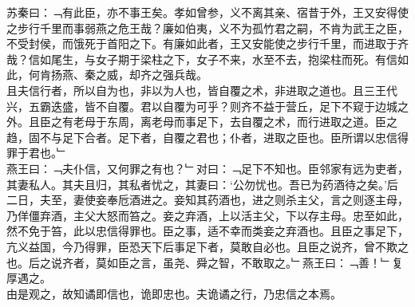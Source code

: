 苏秦曰：﹁有此臣，亦不事王矣。孝如曾参，义不离其亲、宿昔于外，王又安得使之步行千里而事弱燕之危王哉？廉如伯夷，义不为孤竹君之嗣，不肯为武王之臣，不受封侯，而饿死于首阳之下。有廉如此者，王又安能使之步行千里，而进取于齐哉？信如尾生，与女子期于梁柱之下，女子不来，水至不去，抱梁柱而死。有信如此，何肯扬燕、秦之威，却齐之强兵哉。\\
且夫信行者，所以自为也，非以为人也，皆自覆之术，非进取之道也。且三王代兴，五霸迭盛，皆不自覆。君以自覆为可乎？则齐不益于营丘，足下不窥于边城之外。且臣之有老母于东周，离老母而事足下，去自覆之术，而行进取之道。臣之趋，固不与足下合者。足下者，自覆之君也；仆者，进取之臣也。臣所谓以忠信得罪于君也。﹂\\
燕王曰：﹁夫仆信，又何罪之有也？﹂对曰：﹁足下不知也。臣邻家有远为吏者，其妻私人。其夫且归，其私者忧之，其妻曰：‘公勿忧也。吾已为药酒待之矣。’后二日，夫至，妻使妾奉卮酒进之。妾知其药酒也，进之则杀主父，言之则逐主母，乃佯僵弃酒，主父大怒而笞之。妾之弃酒，上以活主父，下以存主母。忠至如此，然不免于笞，此以忠信得罪也。臣之事，适不幸而类妾之弃酒也。且臣之事足下，亢义益国，今乃得罪，臣恐天下后事足下者，莫敢自必也。且臣之说齐，曾不欺之也。后之说齐者，莫如臣之言，虽尧、舜之智，不敢取之。﹂燕王曰：﹁善！﹂复厚遇之。\\
由是观之，故知谲即信也，诡即忠也。夫诡谲之行，乃忠信之本焉。
%
%
